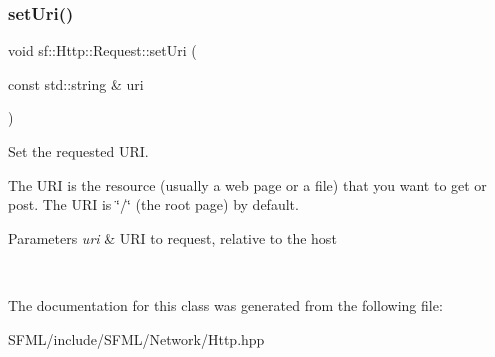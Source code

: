 \subsubsection{\texorpdfstring{setUri()}{setUri()}}
{\footnotesize\ttfamily void sf\+::\+Http\+::\+Request\+::set\+Uri (\begin{DoxyParamCaption}\item[{const std\+::string \&}]{uri }\end{DoxyParamCaption})}



Set the requested U\+RI. 

The U\+RI is the resource (usually a web page or a file) that you want to get or post. The U\+RI is \char`\"{}/\char`\"{} (the root page) by default.


\begin{DoxyParams}{Parameters}
{\em uri} & U\+RI to request, relative to the host \begin{DoxyVerb}\end{DoxyVerb}
 \\
\hline
\end{DoxyParams}


The documentation for this class was generated from the following file\+:\begin{DoxyCompactItemize}
\item 
S\+F\+M\+L/include/\+S\+F\+M\+L/\+Network/Http.\+hpp\end{DoxyCompactItemize}
